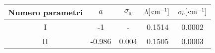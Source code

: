 \begin{tabulary}{\textwidth}{CCCCC}
\toprule
Numero parametri & $a$  & $\sigma_a$ & $b [\,\mathrm{cm}^{-1}]$ & $\sigma_b [\,\mathrm{cm}^{-1}]$\\ \midrule
I & -1 & - & 0.1514 & 0.0002\\ \midrule
II & -0.986 & 0.004 & 0.1505 & 0.0003\\
\bottomrule
\end{tabulary}

